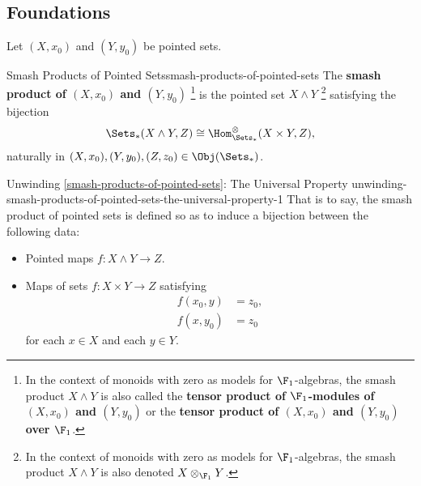 \subsection{Foundations}\label{subsection-smash-products-of-pointed-sets-foundations}
Let $(X,x_{0})$ and $(Y,y_{0})$ be pointed sets.
\begin{definition}{Smash Products of Pointed Sets}{smash-products-of-pointed-sets}%
    The \textbf{smash product of $(X,x_{0})$ and $(Y,y_{0})$}%
    \footnote{%
        In the context of monoids with zero as models for $\F_{1}$-algebras, the smash product $X\wedge Y$ is also called the \textbf{tensor product of $\F_{1}$-modules of $(X,x_{0})$ and $(Y,y_{0})$} or the \textbf{tensor product of $(X,x_{0})$ and $(Y,y_{0})$ over $\F_{1}$}.
    } %
    is the pointed set $X\wedge Y$%
    \footnote{%
        In the context of monoids with zero as models for $\F_{1}$-algebras, the smash product $X\wedge Y$ is also denoted $X\otimes_{\F_{1}}Y$.
        \par\vspace*{\TCBBoxCorrection}
    } %
    satisfying the bijection
    \[
        \Sets_{*}(X\wedge Y,Z)
        \cong
        \Hom^{\otimes}_{\Sets_{*}}(X\times Y,Z),
    \]%
    naturally in $(X,x_{0}),(Y,y_{0}),(Z,z_{0})\in\Obj(\Sets_{*})$.
\end{definition}
\begin{remark}{Unwinding \cref{smash-products-of-pointed-sets}: The Universal Property \rmI}{unwinding-smash-products-of-pointed-sets-the-universal-property-1}%
    That is to say, the smash product of pointed sets is defined so as to induce a bijection between the following data:
    \begin{itemize}
        \item Pointed maps $f\colon X\wedge Y\to Z$.
        \item Maps of sets $f\colon X\times Y\to Z$ satisfying
            \begin{align*}
                f(x_{0},y) &= z_{0},\\
                f(x,y_{0}) &= z_{0}
            \end{align*}
            for each $x\in X$ and each $y\in Y$.
    \end{itemize}
\end{remark}
